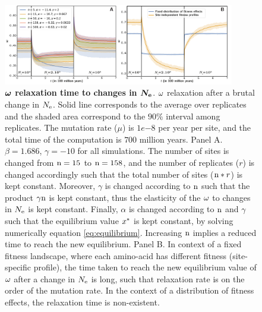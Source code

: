 \documentclass{article}
\begin{document}
\begin{figure}[htb!]
\begin{mdframed}
 \centering
 \includegraphics[width=0.9\textwidth] {artworks/Relaxation.pdf}
 \caption{
  \textbf{$\bm{\omega}$ relaxation time to changes in $\bm{N_{\mathrm{e}}}$}.
  $\omega$ relaxation after a brutal change in $N_{\mathrm{e}}$.
  Solid line corresponds to the average over replicates and the shaded area correspond to the $90\%$ interval among replicates. 
  The mutation rate ($\mu$) is $1e{-8}$ per year per site, and the total time of the computation is $700$ million years.
  Panel A. $\beta=1.686$, $\gamma=-10$ for all simulations. The number of sites is changed from $\text{n}=15$ to $\text{n}=158$, and the number of replicates ($r$) is changed accordingly such that the total number of sites ($\text{n}*r$) is kept constant.
  Moreover, $\gamma$ is changed according to $\text{n}$ such that the product $\gamma\text{n}$ is kept constant, thus the elasticity of the $\omega$ to changes in $N_{\mathrm{e}}$ is kept constant.
  Finally, $\alpha$ is changed according to $\text{n}$ and $\gamma$ such that the equilibrium value $x^{*}$ is kept constant, by solving numerically equation \ref{eq:equilibrium}.
  Increasing $\text{n}$ implies a reduced time to reach the new equilibrium.
  Panel B. In context of a fixed fitness landscape, where each amino-acid has different fitness (site-specific profile), the time taken to reach the new equilibrium value of $\omega$ after a change in $N_{\mathrm{e}}$ is long, such that relaxation rate is on the order of the mutation rate. In the context of a distribution of fitness effects, the relaxation time is non-existent.
 }
 \label{fig:relaxStability}
\end{mdframed}
\end{figure}
\end{document}
